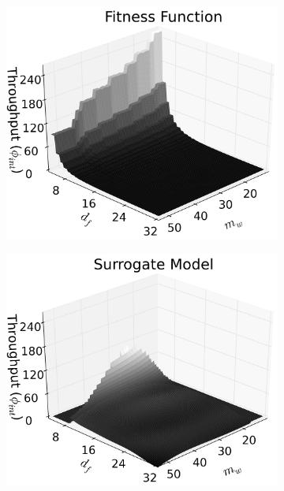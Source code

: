 \documentclass[runningheads,a4paper]{llncs}
\begin{document}
\begin{figure}
        \centering
        \begin{subfigure}[b]{0.31\textwidth}
                \centering
                \includegraphics[width=\textwidth]{./figs/fitness_anson.png}
        \end{subfigure}
        \begin{subfigure}[b]{0.31\textwidth}
                \centering
                \includegraphics[width=\textwidth]{./figs/surmodel020_65_anson.png}

\end{subfigure}
\end{figure}
\end{document}
